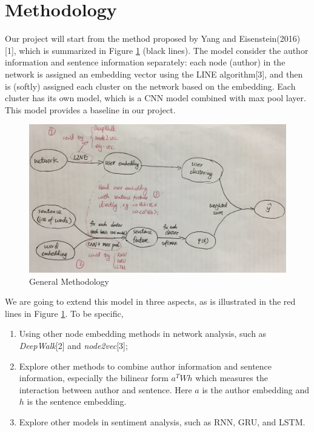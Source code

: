 
\section{Methodology}
\label{Sec:methodology}


Our project will start from the method proposed by Yang and Eisenstein(2016)[1], which is summarized in Figure \ref{Fig:Flow} (black lines). The model consider the author information and sentence information separately: each node (author) in the network is assigned an embedding vector using the LINE algorithm[3], and then is (softly) assigned each cluster on the network based on the embedding. Each cluster has its own model, which is a CNN model combined with max pool layer. This model provides a baseline in our project.

\begin{figure}[htbp] %
   \centering
   \includegraphics[width=5.2in]{flow.jpg} 
   \caption{General Methodology}
   \label{Fig:Flow}
\end{figure}



We are going to extend this model in three aspects, as is illustrated in the red lines in Figure \ref{Fig:Flow}. To be specific, 
\begin{enumerate}   [(1)]
\item Using other node embedding methods in network analysis, such as \textit{DeepWalk}[2] and \textit{node2vec}[3];
\item Explore other methods to combine author information and sentence information, especially the bilinear form $a^T W h$ which measures the interaction between author and sentence. Here $a$ is the author embedding and $h$ is the sentence embedding.
\item Explore other models in sentiment analysis, such as RNN, GRU, and LSTM.
\end{enumerate}
